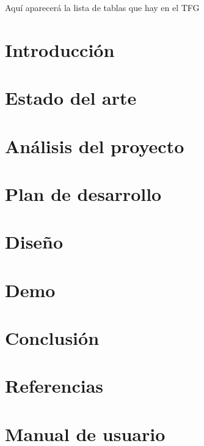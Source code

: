 \documentclass[openright,twoside,10pt]{book}
\begin{document}
Aquí aparecerá la lista de tablas que hay en el TFG

\chapter{Introducción}\label{cap.introduccion}


\chapter{Estado del arte}\label{cap.arte}


\chapter{Análisis del proyecto}\label{cap.analisis}


\chapter{Plan de desarrollo}\label{cap.desarrollo}


\chapter{Diseño}
\label{cap.diseño}


\chapter{Demo}\label{cap.demo}


\chapter{Conclusión}\label{cap.conclusion}


\chapter{Referencias}\label{cap.referencias}



\appendix

\chapter{Manual de usuario}\label{aped.A}

\end{document}
